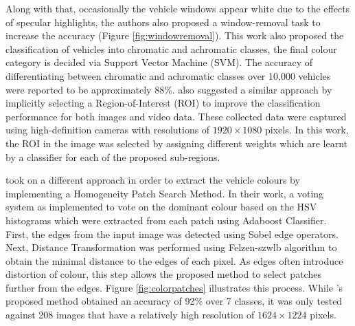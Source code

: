 Along with that, occasionally the vehicle windows appear white due to the
effects of specular highlights, the authors also proposed a window-removal task
to increase the accuracy (Figure \ref{fig:windowremoval}). This work also
proposed the classification of vehicles into chromatic and achromatic classes,
the final colour category is decided via Support Vector Machine (SVM). The
accuracy of differentiating between chromatic and achromatic classes over 10,000
vehicles were reported to be approximately 88\%.  also
suggested a similar approach by implicitly selecting a Region-of-Interest (ROI)
to improve the classification performance for both images and video data. These
collected data were captured using high-definition cameras with resolutions of
$1920 \times 1080$ pixels. In this work, the ROI in the image was selected by
assigning different weights which are learnt by a classifier for each of the
proposed sub-regions.

 took on a different approach in order to extract
the vehicle colours by implementing a Homogeneity Patch Search Method. In their
work, a voting system as implemented to vote on the dominant colour based on the
HSV histograms which were extracted from each patch using Adaboost Classifier.
First, the edges from the input image was detected using Sobel edge operators.
Next, Distance Transformation was performed using Felzen-szwlb algorithm to
obtain the minimal distance to the edges of each pixel. As edges often introduce
distortion of colour, this step allows the proposed method to select patches
further from the edges. Figure \ref{fig:colorpatches} illustrates this
process. While 's proposed method obtained an
accuracy of 92\% over 7 classes, it was only tested against 208 images that have
a relatively high resolution of $1624 \times 1224$ pixels.

